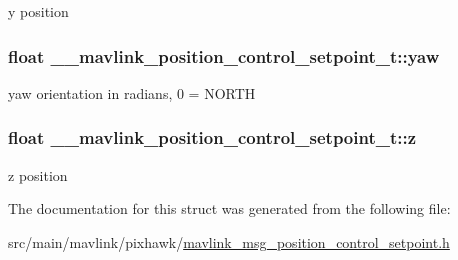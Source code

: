 y position 

\hypertarget{struct____mavlink__position__control__setpoint__t_a565a4aa5cce78efacdda249161e3ee2d}{
\subsubsection[{yaw}]{\setlength{\rightskip}{0pt plus 5cm}float \+\_\+\+\_\+mavlink\+\_\+position\+\_\+control\+\_\+setpoint\+\_\+t\+::yaw}}\label{struct____mavlink__position__control__setpoint__t_a565a4aa5cce78efacdda249161e3ee2d}


yaw orientation in radians, 0 = N\+O\+R\+T\+H 

\hypertarget{struct____mavlink__position__control__setpoint__t_a5ff703f66c6213db9cf85ab644c85538}{
\subsubsection[{z}]{\setlength{\rightskip}{0pt plus 5cm}float \+\_\+\+\_\+mavlink\+\_\+position\+\_\+control\+\_\+setpoint\+\_\+t\+::z}}\label{struct____mavlink__position__control__setpoint__t_a5ff703f66c6213db9cf85ab644c85538}


z position 



The documentation for this struct was generated from the following file\+:\begin{DoxyCompactItemize}
\item 
src/main/mavlink/pixhawk/\hyperlink{mavlink__msg__position__control__setpoint_8h}{mavlink\+\_\+msg\+\_\+position\+\_\+control\+\_\+setpoint.\+h}\end{DoxyCompactItemize}
